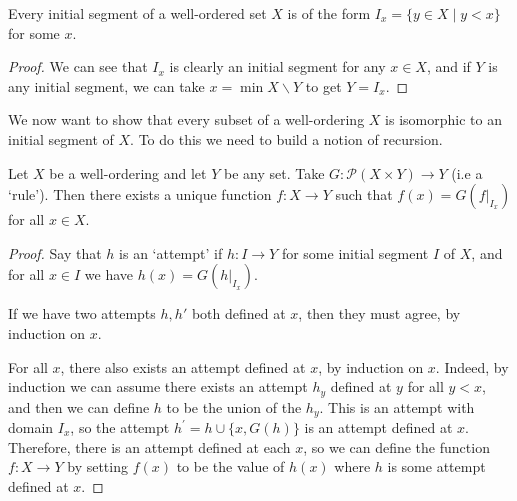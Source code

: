 \documentclass[a3paper, 10pt]{article}
\begin{document}
\begin{multicols*}{5}
\begin{proposition}
  Every initial segment of a well-ordered set $X$ is of the form $I_x = \{y \in X \mid y < x\}$ for some $x$.
\end{proposition}
\begin{proof}
  We can see that $I_x$ is clearly an initial segment for any $x \in X$, and if $Y$ is any initial segment, we can take $x = \min X \backslash Y$ to get $Y = I_x$.
\end{proof}

We now want to show that every subset of a well-ordering $X$ is isomorphic to an initial segment of $X$. To do this we need to build a notion of recursion.




\begin{theorem}
Let $X$ be a well-ordering and let $Y$ be any set. Take $G: \mathcal{P}(X \times Y) \rightarrow Y$ (i.e a `rule'). Then there exists a unique function $f: X \rightarrow Y$ such that $f(x) = G\left(\left.f\right|_{I_x}\right)$ for all $x \in X$.
\end{theorem}
\begin{proof}
Say that $h$ is an `attempt' if $h : I \rightarrow Y$ for some initial segment $I$ of $X$, and for all $x \in I$ we have $h(x) = G\left(\left.h\right|_{I_x}\right)$. 

If we have two attempts $h, h'$ both defined at $x$, then they must agree, by induction on $x$.

For all $x$, there also exists an attempt defined at $x$, by induction on $x$. Indeed, by induction we can assume there exists an attempt $h_y$ defined at $y$ for all $y<x$, and then we can define $h$ to be the union of the $h_y$. This is an attempt with domain $I_x$, so the attempt $h^{\prime}=h \cup\{x, G(h)\}$ is an attempt defined at $x$. Therefore, there is an attempt defined at each $x$, so we can define the function $f: X \rightarrow Y$ by setting $f(x)$ to be the value of $h(x)$ where $h$ is some attempt defined at $x$.


\end{proof}
\end{multicols*}
\end{document}

